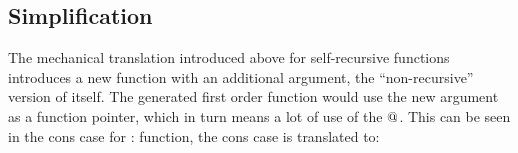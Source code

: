 \begin{comment}
\subsection{Mutually Recursive Functions}

You can also mechanically transform mutually recursive functions to be
defined in terms of \hs{fix}. The functions \hs{even} and \hs{odd}
defined below, which determines if a \hs{Nat} is even, and odd,
respectively, are straightforwardly written by mutual recursion:

\begin{code}
even :: Nat -> Bool           odd :: Nat -> Bool
even Z     = True             odd Z     = False
even (S x) = odd x            odd (S x) = even x
\end{code}

To write these functions in terms of fix, as an additional argument,
the take a tuple of ``non-recursive'' copies of themselves.

\begin{code}
evenToFix :: (Nat -> Bool,Nat -> Bool) -> Nat -> Bool
evenToFix (evenUnFix,oddUnFix) Z     = True
evenToFix (evenUnFix,oddUnFix) (S x) = oddUnFix x

oddToFix :: (Nat -> Bool,Nat -> Bool) -> Nat -> Bool
oddToFix (evenUnFix,oddUnFix) Z     = True
oddToFix (evenUnFix,oddUnFix) (S x) = evenUnFix x
\end{code}

Here the prefix \hs{ToFix} means that it is a function subject to be
\hs{fix}-ed, and \hs{UnFix} means that it is the ``non-recursive''
function. The functions above can now be \hs{fix}-ed by giving the
tuple as an argument to both of them:

\begin{code}
even',odd' :: Nat -> Bool
(even',odd') = fix (\t -> (evenToFix t,oddToFix t))
\end{code}

This encoding makes \hs{even'} denotationally equal to \hs{even} and
the same relation hols for \hs{odd'} and \hs{odd}.
\end{comment}

\subsection{Simplification}

The mechanical translation introduced above for self-recursive
functions introduces a new function with an additional argument, the
``non-recursive'' version of itself. The generated first order
function would use the new argument as a function pointer, which in
turn means a lot of use of the $@$. This can be seen in the cons
case for :
function, the cons case is translated to:

